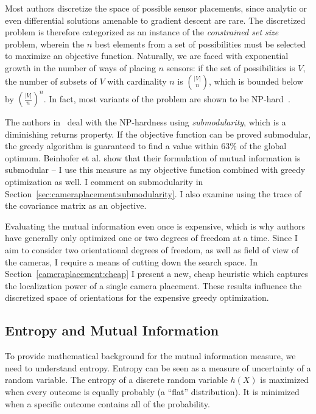 \documentclass[a4paper,12pt,twoside,openright]{report}
\begin{document}
Most authors discretize the space of possible sensor placements, since analytic or
even differential solutions amenable to gradient descent are rare. The discretized
problem is therefore categorized as an instance of the \textit{constrained set size} problem,
wherein the $n$ best elements from a set of possibilities must be selected to maximize an objective function.
Naturally, we are faced with exponential growth in the number of ways of placing
$n$ sensors: if the set of possibilities is $V$, the number of subsets of $V$ with cardinality
$n$ is $|V| \choose n$, which is bounded below by $(\frac{|V|}{n})^n$. In fact, most variants 
of the problem are shown to be NP-hard~\cite{beinhofer2014landmark}.

The authors in~\cite{beinhofer2011near} deal with the NP-hardness 
using \textit{submodularity}, which is a diminishing returns property.
If the objective function can be proved submodular, the greedy
algorithm is guaranteed to find a value within 63\% of the global optimum.
Beinhofer et al. show that their formulation of mutual information is submodular --
I use this measure as my objective function combined with greedy optimization as well.
I comment on submodularity in Section~\ref{sec:cameraplacement:submodularity}. I also
examine using the trace of the covariance matrix as an objective.

Evaluating the mutual information even once is expensive, which is why authors have generally
only optimized one or two degrees of freedom at a time. Since I aim
to consider two orientational degrees of freedom, as well as field of view of the cameras, 
I require a means of cutting down the search space. In Section~\ref{cameraplacement:cheap} 
I present a new, cheap heuristic which captures the localization power of a single camera placement.
These results influence the discretized space of orientations for the expensive greedy optimization.


\subsection{Entropy and Mutual Information}
To provide mathematical background for the mutual information measure, we need to understand entropy.
Entropy can be seen as a measure of uncertainty of a random variable. 
The entropy of a discrete random variable $h(X)$ is maximized when
every outcome is equally probably (a ``flat'' distribution).
It is minimized when a specific outcome contains all of the probability.
\end{document}
